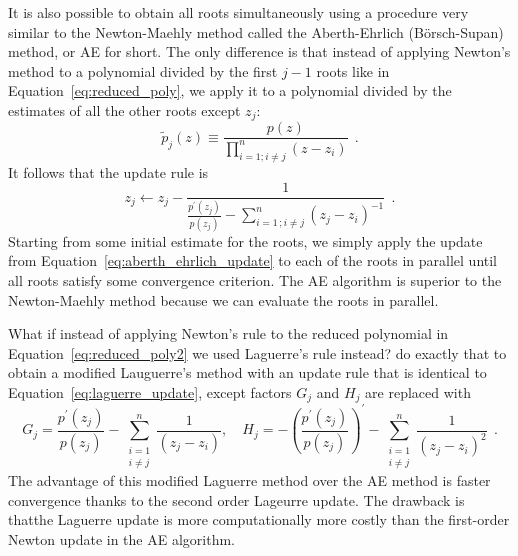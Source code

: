 \documentclass[12pt,dvipsnames]{report}
\newcommand{\ssf}[1]{\textsf{#1}}
\newcommand{\hquad}{~~}
\begin{document}
It is also possible to obtain all roots simultaneously using a procedure very similar to 
the Newton-Maehly method called the \ssf{Aberth-Ehrlich} (\ssf{B\"{o}rsch-Supan}) method,
or AE for short. The only difference is that instead of applying Newton's method to a 
polynomial divided by the first $j-1$ roots like in Equation~\ref{eq:reduced_poly}, we 
apply it to a polynomial divided by the estimates of all the other roots except $z_j$:
\begin{equation}
    \tilde{p}_{j}(z) \equiv \frac{p(z)}{\prod_{i=1;i\neq j}^{n}(z-z_i)}
    \hquad .
    \label{eq:reduced_poly2}
\end{equation}
It follows that the update rule is 
\begin{equation}
    z_j \leftarrow z_j - \frac{1}{\frac{p^\prime (z_j)}{p(z_j)} - \sum_{i=1\,;i\neq j}^{n}\left(z_j-z_{i}\right)^{-1}}
    \hquad .
    \label{eq:aberth_ehrlich_update}
\end{equation}
Starting from some initial estimate for the roots, we simply apply the update from
Equation~\ref{eq:aberth_ehrlich_update} to each of the roots in parallel until all 
roots satisfy some convergence criterion. The AE algorithm is superior to the Newton-Maehly
method because we can evaluate the roots in parallel.

What if instead of applying Newton's rule to the reduced polynomial in 
Equation~\ref{eq:reduced_poly2} we used Laguerre's rule instead?  \citet{cameron2019} 
do exactly that to obtain a modified Lauguerre's method with an update rule that is 
identical to Equation~\ref{eq:laguerre_update}, except factors $G_j$ and $H_j$ are 
replaced with
\begin{equation}
    G_{j}=\frac{p^{\prime}\left(z_{j}\right)}{p\left(z_{j}\right)}-
    \sum_{\substack{i=1 \\ i \neq j}}^{n} \frac{1}{\left(z_{j}-z_{i}\right)} ,\quad H_{j}=-\left(\frac{p^{\prime}\left(z_{j}\right)}{p\left(z_{j}\right)}\right)^{\prime}-\sum_{\substack{i=1 \\ i \neq j}}^{n} \frac{1}{\left(z_{j}-z_{i}\right)^{2}}
    \hquad.
\end{equation}
The advantage of this modified Laguerre method over the AE method is faster convergence 
thanks to the second order Lageurre update. The drawback is thatthe Laguerre update is more 
computationally more costly than the first-order Newton update in the AE algorithm. 
\end{document}
